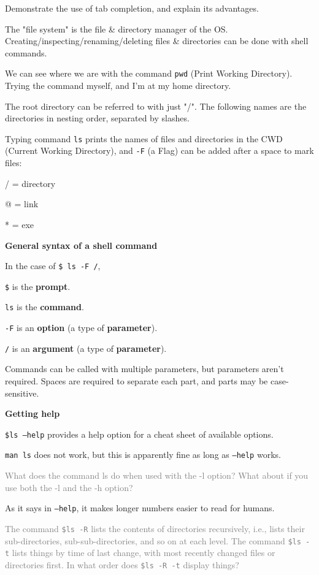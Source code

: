 \documentclass[12pt]{article}
\begin{document}
Demonstrate the use of tab completion, and explain its advantages.
\color{black}

\vspace{1em}
The "file system" is the file \& directory manager of the OS. Creating/inspecting/renaming/deleting files \& directories can be done with shell commands.

We can see where we are with the command \texttt{pwd} (Print Working Directory). Trying the command myself, and I'm at my home directory.

The root directory can be referred to with just "/". The following names are the directories in nesting order, separated by slashes.

Typing command \texttt{ls} prints the names of files and directories in the CWD (Current Working Directory), and \texttt{-F} (a Flag) can be added after a space to mark files:

/ = directory

@ = link

* = exe

\newpage
\textbf{General syntax of a shell command}

In the case of \texttt{\$ ls -F /},

\texttt{\$} is the \textbf{prompt}.

\texttt{ls} is the \textbf{command}.

\texttt{-F} is an \textbf{option} (a type of \textbf{parameter}).

\texttt{/} is an \textbf{argument} (a type of \textbf{parameter}).

Commands can be called with multiple parameters, but parameters aren't required. Spaces are required to separate each part, and parts may be case-sensitive.

\vspace{1em}
\textbf{Getting help}

\texttt{\$ls --help} provides a help option for a cheat sheet of available options.

\texttt{man ls} does not work, but this is apparently fine as long as \texttt{--help} works.

\vspace{1em}
\textcolor{gray}{What does the command ls do when used with the -l option? What about if you use both the -l and the -h option?}

As it says in \texttt{--help}, it makes longer numbers easier to read for humans.

\vspace{1em}
\textcolor{gray}{The command \texttt{\$ls -R} lists the contents of directories recursively, i.e., lists their sub-directories, sub-sub-directories, and so on at each level. The command \texttt{\$ls -t} lists things by time of last change, with most recently changed files or directories first. In what order does \texttt{\$ls -R -t} display things?}
\end{document}
